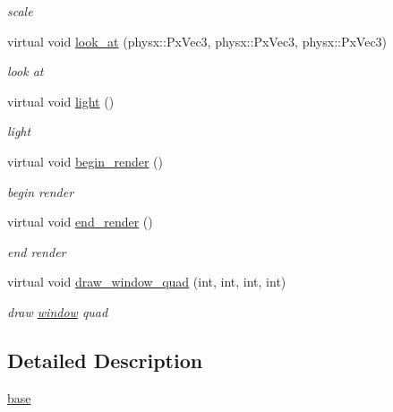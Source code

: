 \begin{DoxyCompactItemize}
\begin{DoxyCompactList}\small\item\em scale \item\end{DoxyCompactList}\item 
virtual void \hyperlink{classnebula_1_1platform_1_1renderer_1_1gl_1_1glx_1_1base_ac1e401ba57d7b5a09ba684529092ea38}{look\_\-at} (physx::PxVec3, physx::PxVec3, physx::PxVec3)
\begin{DoxyCompactList}\small\item\em look at \item\end{DoxyCompactList}\item 
virtual void \hyperlink{classnebula_1_1platform_1_1renderer_1_1gl_1_1glx_1_1base_a111905577043b961ebf0f7111e8ec998}{light} ()
\begin{DoxyCompactList}\small\item\em light \item\end{DoxyCompactList}\item 
virtual void \hyperlink{classnebula_1_1platform_1_1renderer_1_1gl_1_1glx_1_1base_abfc5fa20a21e5278d6a49103f017c8e6}{begin\_\-render} ()
\begin{DoxyCompactList}\small\item\em begin render \item\end{DoxyCompactList}\item 
virtual void \hyperlink{classnebula_1_1platform_1_1renderer_1_1gl_1_1glx_1_1base_aaf176ccae80229814c17536d2c9aa24e}{end\_\-render} ()
\begin{DoxyCompactList}\small\item\em end render \item\end{DoxyCompactList}\item 
virtual void \hyperlink{classnebula_1_1platform_1_1renderer_1_1gl_1_1glx_1_1base_a969f44b3066064468c15596562c18e00}{draw\_\-window\_\-quad} (int, int, int, int)
\begin{DoxyCompactList}\small\item\em draw \hyperlink{namespacenebula_1_1platform_1_1window}{window} quad \item\end{DoxyCompactList}\end{DoxyCompactItemize}


\subsection{Detailed Description}
\hyperlink{classnebula_1_1platform_1_1renderer_1_1gl_1_1glx_1_1base}{base} 

